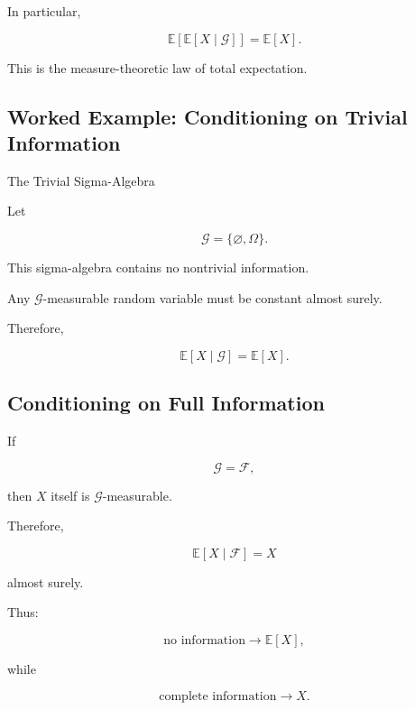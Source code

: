 In particular,

\[
\boxed{
\mathbb{E}
[
\mathbb{E}[X\mid\mathcal{G}]
]
=
\mathbb{E}[X].
}
\]

This is the measure-theoretic law of total expectation.

\subsection{Worked Example: Conditioning on Trivial Information}
\label{subsec:worked-trivial-conditioning}

\begin{workedexamplebox}{The Trivial Sigma-Algebra}

Let

\[
\mathcal{G}
=
\{\varnothing,\Omega\}.
\]

This sigma-algebra contains no nontrivial information.

Any \(\mathcal{G}\)-measurable random variable must be constant almost
surely.

Therefore,

\begin{answerbox}
\[
\boxed{
\mathbb{E}[X\mid\mathcal{G}]
=
\mathbb{E}[X].
}
\]
\end{answerbox}

\end{workedexamplebox}

\subsection{Conditioning on Full Information}
\label{subsec:conditioning-full-information}

If

\[
\mathcal{G}
=
\mathcal{F},
\]

then \(X\) itself is \(\mathcal{G}\)-measurable.

Therefore,

\[
\boxed{
\mathbb{E}[X\mid\mathcal{F}]
=
X
}
\]

almost surely.

Thus:

\[
\boxed{
\text{no information}
\longrightarrow
\mathbb{E}[X],
}
\]

while

\[
\boxed{
\text{complete information}
\longrightarrow
X.
}
\]


